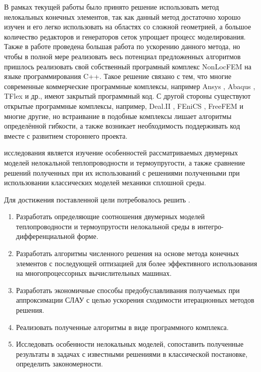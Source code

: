В рамках текущей работы было принято решение использовать метод нелокальных конечных элементов, так как данный метод достаточно хорошо изучен и его легко использовать на областях со сложной геометрией, а большое количество редакторов и генераторов сеток упрощает процесс моделирования. Также в работе проведена большая работа по ускорению данного метода, но чтобы в полной мере реализовать весь потенциал предложенных алгоритмов пришлось реализовать свой собственный програмный комплекс NonLocFEM \cite{NonLocFEM} на языке программирования C++. Такое решение связано с тем, что многие современные коммерческие программные комплексы, например Ansys \cite{Ansys}, Abaqus \cite{Abaqus}, TFlex \cite{TFlex} и др., имеют закрытый программный код. С другой стороны существуют открытые программные комплексы, например, Deal.II \cite{DealII}, FEniCS \cite{FEniCS}, FreeFEM \cite{FreeFEM} и многие другие, но встраивание в подобные комплексы лишает алгоритмы определённой гибкости, а также возникает необходимость поддерживать код вместе с развитием стороннего проекта.



{\aim}
исследования является изучение особенностей рассматриваемых двумерных моделей нелокальной теплопроводности и термоупругости, а также сравнение решений полученных при их использований с решениями полученными при использовании классических моделей механики сплошной среды.

Для достижения поставленной цели потребовалось решить {\tasks}.
\begin{enumerate}[beginpenalty=10000] %
  \item Разработать определяющие соотношения двумерных моделей теплопроводности и термоупругости нелокальной среды в интегро-дифференциальной форме.
  \item Разработать алгоритмы численного решения на основе метода конечных элементов с последующей оптизацией для более эффективного использования на многопроцессорных вычислительных машинах.
  \item Разработать экономичные способы предобуславливания получаемых при аппроксимации СЛАУ с целью ускорения сходимости итерационных методов решения.
  \item Реализовать полученные алгоритмы в виде программного комплекса.
  \item Исследовать особенности нелокальных моделей, сопоставить полученные результаты в задачах с известными решениями в классической постановке, определить закономерности.
\end{enumerate}


